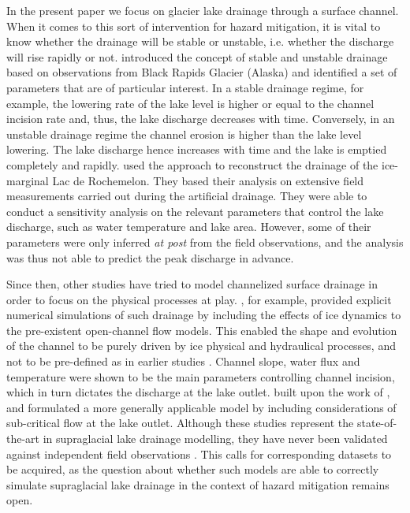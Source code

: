 In the present paper we focus on glacier lake drainage through a surface channel. When it comes to this sort of intervention for hazard mitigation, it is vital to know whether the drainage will be stable or unstable, i.e. whether the discharge will rise rapidly or not. \cite{Raymond&Nolan2000} introduced the concept of stable and unstable drainage based on observations from Black Rapids Glacier (Alaska) and identified a set of parameters that are of particular interest. In a stable drainage regime, for example, the lowering rate of the lake level is higher or equal to the channel incision rate and, thus, the lake discharge decreases with time. Conversely, in an unstable drainage regime the channel erosion is higher than the lake level lowering. The lake discharge hence increases with time and the lake is emptied completely and rapidly. \cite{Vincent&al2010} used the \cite{Raymond&Nolan2000} approach to reconstruct the drainage of the ice-marginal Lac de Rochemelon. They based their analysis on extensive field measurements carried out during the artificial drainage. They were able to conduct a sensitivity analysis on the relevant parameters that control the lake discharge, such as water temperature and lake area. However, some of their parameters were only inferred \textit{at post} from the field observations, and the analysis was thus not able to predict the peak discharge in advance.

Since then, other studies have tried to model channelized surface drainage in order to focus on the physical processes at play. \cite{Jarosch&Gudmundsson2012}, for example, provided explicit numerical simulations of such drainage by including the effects of ice dynamics to the pre-existent open-channel flow models. This enabled the shape and evolution of the channel to be purely driven by ice physical and hydraulical processes, and not to be pre-defined as in earlier studies \citep[e.g.][]{Raymond&Nolan2000,Walder&Costa1996}. Channel slope, water flux and temperature were shown to be the main parameters controlling channel incision, which in turn dictates the discharge at the lake outlet. \cite{Kingslake&al2015} built upon the work of \cite{Raymond&Nolan2000}, and formulated a more generally applicable model by including considerations of sub-critical flow at the lake outlet. Although these studies represent the state-of-the-art in supraglacial lake drainage modelling, they have never been validated against independent field observations \citep{Pitcher&Smith2019}. This calls for corresponding datasets to be acquired, as the question about whether such models are able to correctly simulate supraglacial lake drainage in the context of hazard mitigation remains open.

